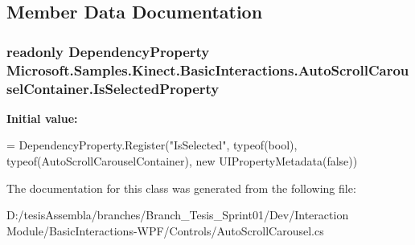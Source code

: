 \subsection{Member Data Documentation}
\hypertarget{class_microsoft_1_1_samples_1_1_kinect_1_1_basic_interactions_1_1_auto_scroll_carousel_container_ac6aee69de136d73290740eae16120ec2}{
\subsubsection[{Is\-Selected\-Property}]{\setlength{\rightskip}{0pt plus 5cm}readonly Dependency\-Property Microsoft.\-Samples.\-Kinect.\-Basic\-Interactions.\-Auto\-Scroll\-Carousel\-Container.\-Is\-Selected\-Property\hspace{0.3cm}{\ttfamily [static]}}}\label{class_microsoft_1_1_samples_1_1_kinect_1_1_basic_interactions_1_1_auto_scroll_carousel_container_ac6aee69de136d73290740eae16120ec2}
{\bfseries Initial value\-:}
\begin{DoxyCode}
=
            DependencyProperty.Register(\textcolor{stringliteral}{"IsSelected"}, typeof(\textcolor{keywordtype}{bool}), typeof(AutoScrollCarouselContainer), \textcolor{keyword}{
      new} UIPropertyMetadata(\textcolor{keyword}{false}))
\end{DoxyCode}


The documentation for this class was generated from the following file\-:\begin{DoxyCompactItemize}
\item 
D\-:/tesis\-Assembla/branches/\-Branch\-\_\-\-Tesis\-\_\-\-Sprint01/\-Dev/\-Interaction Module/\-Basic\-Interactions-\/\-W\-P\-F/\-Controls/Auto\-Scroll\-Carousel.\-cs\end{DoxyCompactItemize}
